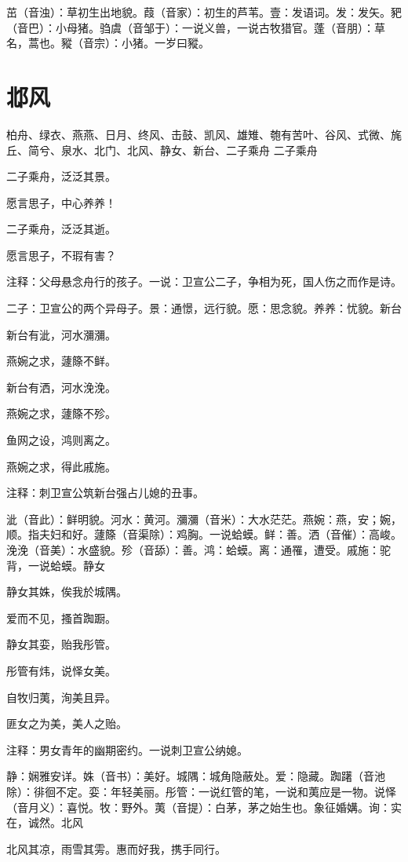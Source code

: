 \documentclass[12pt,UTF8]{ctexbook}
\begin{document}
茁（音浊）：草初生出地貌。葭（音家）：初生的芦苇。壹：发语词。发：发矢。豝（音巴）：小母猪。驺虞（音邹于）：一说义兽，一说古牧猎官。蓬（音朋）：草名，蒿也。豵（音宗）：小猪。一岁曰豵。



\part{邶风}
柏舟、绿衣、燕燕、日月、终风、击鼓、凯风、雄雉、匏有苦叶、谷风、式微、旄丘、简兮、泉水、北门、北风、静女、新台、二子乘舟
二子乘舟 

二子乘舟，泛泛其景。

愿言思子，中心养养！

二子乘舟，泛泛其逝。

愿言思子，不瑕有害？

注释：父母悬念舟行的孩子。一说：卫宣公二子，争相为死，国人伤之而作是诗。

二子：卫宣公的两个异母子。景：通憬，远行貌。愿：思念貌。养养：忧貌。新台

新台有泚，河水瀰瀰。

燕婉之求，蘧篨不鲜。

新台有洒，河水浼浼。

燕婉之求，蘧篨不殄。

鱼网之设，鸿则离之。

燕婉之求，得此戚施。

注释：刺卫宣公筑新台强占儿媳的丑事。

泚（音此）：鲜明貌。河水：黄河。瀰瀰（音米）：大水茫茫。燕婉：燕，安；婉，顺。指夫妇和好。蘧篨（音渠除）：鸡胸。一说蛤蟆。鲜：善。洒（音催）：高峻。浼浼（音美）：水盛貌。殄（音舔）：善。鸿：蛤蟆。离：通罹，遭受。戚施：驼背，一说蛤蟆。静女

静女其姝，俟我於城隅。

爱而不见，搔首踟蹰。

静女其娈，贻我彤管。

彤管有炜，说怿女美。

自牧归荑，洵美且异。

匪女之为美，美人之贻。

注释：男女青年的幽期密约。一说刺卫宣公纳媳。

静：娴雅安详。姝（音书）：美好。城隅：城角隐蔽处。爱：隐藏。踟躇（音池除）：徘徊不定。娈：年轻美丽。彤管：一说红管的笔，一说和荑应是一物。说怿（音月义）：喜悦。牧：野外。荑（音提）：白茅，茅之始生也。象征婚媾。询：实在，诚然。北风

北风其凉，雨雪其雱。惠而好我，携手同行。
\end{document}
